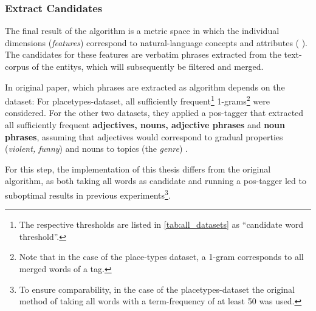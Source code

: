 \subsubsection{Extract Candidates}
\label{sec:extract_cands}

The final result of the algorithm is a metric space in which the individual dimensions (\emph{\glspl{feature}}) correspond to natural-language concepts and attributes ( \cite{Derrac2015}). The candidates for these features are verbatim phrases extracted from the text-corpus of the \glspl{entity}, which will subsequently be filtered and merged.

In  original paper, which phrases are extracted as algorithm depends on the dataset: For placetypes-dataset, all sufficiently frequent\footnote{\label{fnote:cand_thresholds}The respective thresholds are listed in \autoref{tab:all_datasets} as ``candidate word threshold''.} 1-grams\footnote{Note that in the case of the place-types dataset, a 1-gram corresponds to all merged words of a tag.} were considered. For the other two datasets, they applied a \gls{pos}-tagger that extracted all sufficiently frequent \textbf{adjectives, nouns, adjective phrases} and \textbf{noun phrases}, assuming that adjectives would correspond to gradual properties (\eg \textit{violent, funny}) and nouns to topics (\eg the \textit{genre}) \cite[Sec. 4.2.1]{Derrac2015}.

For this step, the implementation of this thesis differs from the original algorithm, as both taking all words as candidate and running a \gls{pos}-tagger led to suboptimal results in previous experiments\footnote{To ensure comparability, in the case of the placetypes-dataset the original method of taking all words with a term-frequency of at least 50 was used.}. 

